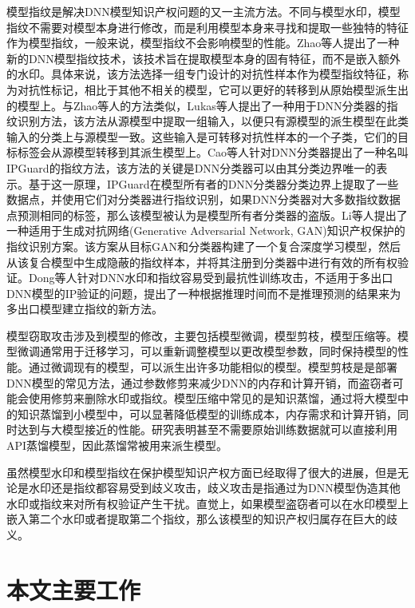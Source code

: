 模型指纹是解决DNN模型知识产权问题的又一主流方法。不同与模型水印，模型指纹不需要对模型本身进行修改，而是利用模型本身来寻找和提取一些独特的特征作为模型指纹，一般来说，模型指纹不会影响模型的性能。Zhao等人\cite{zhao2020afa}提出了一种新的DNN模型指纹技术，该技术旨在提取模型本身的固有特征，而不是嵌入额外的水印。具体来说，该方法选择一组专门设计的对抗性样本作为模型指纹特征，称为对抗性标记，相比于其他不相关的模型，它可以更好的转移到从原始模型派生出的模型上。与Zhao等人\cite{zhao2020afa}的方法类似，Lukas等人\cite{lukas2019deep}提出了一种用于DNN分类器的指纹识别方法，该方法从源模型中提取一组输入，以便只有源模型的派生模型在此类输入的分类上与源模型一致。这些输入是可转移对抗性样本的一个子类，它们的目标标签会从源模型转移到其派生模型上。Cao等人\cite{cao2021ipguard}针对DNN分类器提出了一种名叫IPGuard的指纹方法，该方法的关键是DNN分类器可以由其分类边界唯一的表示。基于这一原理，IPGuard在模型所有者的DNN分类器分类边界上提取了一些数据点，并使用它们对分类器进行指纹识别，如果DNN分类器对大多数指纹数据点预测相同的标签，那么该模型被认为是模型所有者分类器的盗版。Li等人\cite{li2021novel}提出了一种适用于生成对抗网络(Generative Adversarial Network, GAN)\cite{goodfellow2020generative}知识产权保护的指纹识别方案。该方案从目标GAN和分类器构建了一个复合深度学习模型，然后从该复合模型中生成隐蔽的指纹样本，并将其注册到分类器中进行有效的所有权验证。Dong等人\cite{dong2021fingerprinting}针对DNN水印和指纹容易受到最抗性训练攻击，不适用于多出口DNN模型的IP验证的问题，提出了一种根据推理时间而不是推理预测的结果来为多出口模型建立指纹的新方法。

模型窃取攻击涉及到模型的修改，主要包括模型微调，模型剪枝，模型压缩等。模型微调通常用于迁移学习，可以重新调整模型以更改模型参数，同时保持模型的性能。通过微调现有的模型，可以派生出许多功能相似的模型。模型剪枝是是部署DNN模型的常见方法，通过参数修剪来减少DNN的内存和计算开销，而盗窃者可能会使用修剪来删除水印或指纹。模型压缩中常见的是知识蒸馏，通过将大模型中的知识蒸馏到小模型中，可以显著降低模型的训练成本，内存需求和计算开销，同时达到与大模型接近的性能。研究\cite{hinton2015distilling}表明甚至不需要原始训练数据就可以直接利用API蒸馏模型，因此蒸馏常被用来派生模型。

虽然模型水印和模型指纹在保护模型知识产权方面已经取得了很大的进展，但是无论是水印还是指纹都容易受到歧义攻击\cite{fan2019rethinking,li2019piracy}，歧义攻击是指通过为DNN模型伪造其他水印或指纹来对所有权验证产生干扰。直觉上，如果模型盗窃者可以在水印模型上嵌入第二个水印或者提取第二个指纹，那么该模型的知识产权归属存在巨大的歧义。

\section{本文主要工作}

